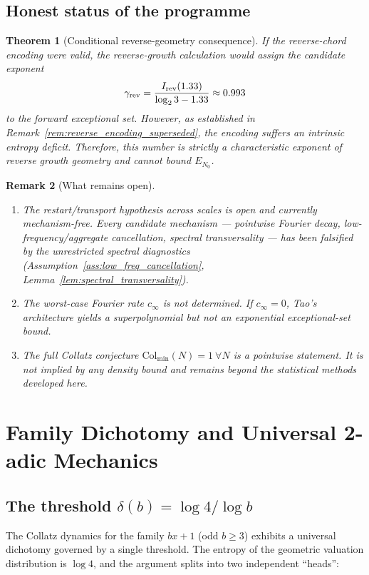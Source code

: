 \documentclass[12pt,a4paper]{article}
\newtheorem{theorem}{Theorem}[section]
\newtheorem{remark}[theorem]{Remark}
\begin{document}
\subsection{Honest status of the programme}

\begin{theorem}[Conditional reverse-geometry consequence]
\label{thm:final}
If the reverse-chord encoding were valid, the reverse-growth calculation
would assign the candidate exponent
\[
 \gamma_{\rm rev}
 =\frac{I_{\rm rev}(1.33)}{\log_2 3-1.33}\approx0.993
\]
to the forward exceptional set. However, as established in
Remark~\ref{rem:reverse_encoding_superseded}, the encoding suffers an intrinsic
entropy deficit. Therefore, this number is strictly a characteristic exponent of
reverse growth geometry and cannot bound $E_{N_0}$.
\end{theorem}

\begin{remark}[What remains open]
\begin{enumerate}
\item[(i)] The restart/transport hypothesis across scales is open and currently
mechanism-free. Every candidate mechanism --- pointwise Fourier decay,
low-frequency/aggregate cancellation, spectral transversality --- has been
falsified by the unrestricted spectral diagnostics
(Assumption~\ref{ass:low_freq_cancellation}, Lemma~\ref{lem:spectral_transversality}).
\item[(ii)] The worst-case Fourier rate $c_\infty$ is not determined. If
$c_\infty=0$, Tao's architecture yields a superpolynomial but not an
exponential exceptional-set bound.
\item[(iii)] The full Collatz conjecture $\mathrm{Col}_{\min}(N)=1\ \forall N$
is a pointwise statement. It is not implied by any density bound and remains
beyond the statistical methods developed here.
\end{enumerate}
\end{remark}

\section{Family Dichotomy and Universal 2-adic Mechanics}

\subsection{The threshold $\delta(b) = \log 4 / \log b$}

The Collatz dynamics for the family $bx+1$ (odd $b \ge 3$) exhibits a universal 
dichotomy governed by a single threshold. The entropy of the geometric valuation 
distribution is $\log 4$, and the argument splits into two independent ``heads'':
\end{document}
